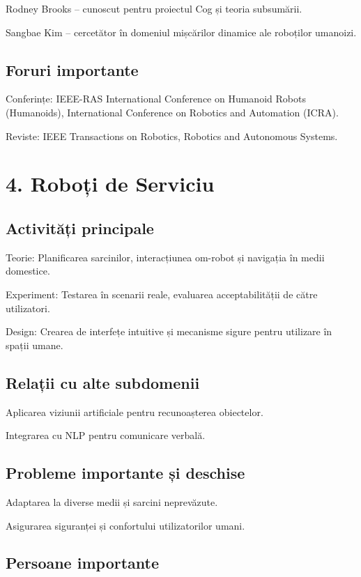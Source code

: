 \documentclass[12pt]{article}
\begin{document}
Rodney Brooks – cunoscut pentru proiectul Cog și teoria subsumării.

Sangbae Kim – cercetător în domeniul mișcărilor dinamice ale roboților umanoizi.

\subsection*{Foruri importante}

Conferințe: IEEE-RAS International Conference on Humanoid Robots (Humanoids), International Conference on Robotics and Automation (ICRA).

Reviste: IEEE Transactions on Robotics, Robotics and Autonomous Systems.

\section{4. Roboți de Serviciu}

\subsection*{Activități principale}

Teorie: Planificarea sarcinilor, interacțiunea om-robot și navigația în medii domestice.

Experiment: Testarea în scenarii reale, evaluarea acceptabilității de către utilizatori.

Design: Crearea de interfețe intuitive și mecanisme sigure pentru utilizare în spații umane.

\subsection*{Relații cu alte subdomenii}

Aplicarea viziunii artificiale pentru recunoașterea obiectelor.

Integrarea cu NLP pentru comunicare verbală.

\subsection*{Probleme importante și deschise}

Adaptarea la diverse medii și sarcini neprevăzute.

Asigurarea siguranței și confortului utilizatorilor umani.

\subsection*{Persoane importante}
\end{document}
